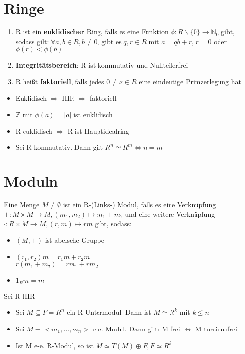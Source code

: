 \section{Ringe}
\begin{definition}
\leavevmode
\begin{enumerate}
	\item R ist ein \textbf{euklidischer} Ring, falls es eine Funktion $\phi : R\backslash \{0\} \rightarrow \mathbb{N}_0$ gibt, sodass gilt:
	$\forall a,b \in R, b \neq 0$, gibt es $q,r \in R$ mit $a=qb+r$, $r=0$ oder $\phi(r) < \phi (b)$
	\item \textbf{Integritätsbereich}: R ist kommutativ und Nullteilerfrei
	\item R heißt \textbf{faktoriell}, falls jedes $0 \neq x \in R$ eine eindeutige Primzerlegung hat
\end{enumerate}
\end{definition}
\begin{remark}
\begin{itemize}
	\item Euklidisch $\Rightarrow$ HIR $\Rightarrow$ faktoriell
	\item $\mathbb{Z}$ mit $\phi(a) = |a|$ ist euklidisch
	\item R euklidisch $\Rightarrow$ R ist Hauptidealring
	\item Sei R kommutativ. Dann gilt $R^n \simeq R^m \Leftrightarrow n=m$
\end{itemize}
\end{remark}

\section{Moduln}
\begin{definition}
Eine Menge $M \neq \emptyset$ ist ein R-(Links-) Modul, falls es eine Verknüpfung $+:M \times M \rightarrow M, (m_1,m_2) \mapsto m_1+m_2$ und eine weitere Verknüpfung $\cdot:R \times M \rightarrow M, (r,m) \mapsto rm$ gibt, sodass:
\begin{itemize}
	\item $(M,+)$ ist abelsche Gruppe
	\item $(r_1,r_2)m = r_1 m + r_2 m$\\$r(m_1+m_2) = rm_1+rm_2$
	\item $1_R m = m$
\end{itemize}
\end{definition}
\begin{remark}
Sei R HIR
\begin{itemize}
	\item Sei $ M \subseteq F = R^n$ ein R-Untermodul. Dann ist $M \simeq R^k$ mit $k \leq n$
	\item Sei $M=<m_1,...,m_n>$ e-e. Modul. Dann gilt: M frei $\Leftrightarrow$ M torsionsfrei
	\item Ist M e-e. R-Modul, so ist $M \simeq T(M) \oplus F, F \simeq R^k$
\end{itemize}
\end{remark}

